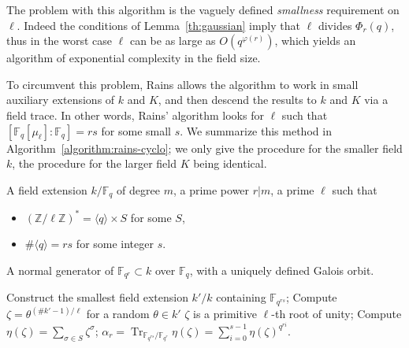 \documentclass[12pt]{article}
\theoremstyle{plain}
\theoremstyle{definition}
\DeclareMathOperator{\trace}{Tr} %
\def\Z{\ensuremath{\mathbb{Z}}}
\def\F{\ensuremath{\mathbb{F}}}
\def\euler{\ensuremath{\varphi}}
\newcounter{algorithm}
\begin{document}
The problem with this algorithm is the vaguely defined
\emph{smallness} requirement on $\ell$. Indeed the conditions of
Lemma~\ref{th:gaussian} imply that $\ell$ divides $\Phi_r(q)$, thus in
the worst case $\ell$ can be as large as $O(q^{\euler(r)})$, which
yields an algorithm of exponential complexity in the field size.

To circumvent this problem, Rains allows the algorithm to work in
small auxiliary extensions of $k$ and $K$, and then descend the
results to $k$ and $K$ via a field trace. In other words, Rains'
algorithm looks for $\ell$ such that $[\F_q[\mu_\ell]:\F_q]=rs$ for
some small $s$. We summarize this method in
Algorithm~\ref{algorithm:rains-cyclo}; we only give the procedure for
the smaller field $k$, the procedure for the larger field $K$ being
identical.

\begin{algorithm}
  \label{algorithm:rains-cyclo}
  \begin{algorithmic}[1]
    \REQUIRE A field extension $k/\F_q$ of degree $m$, a prime power
    $r|m$, a prime $\ell$ such that
    \begin{itemize}
    \item $(\Z/\ell\Z)^\ast = \langle q\rangle \times S$ for some $S$,
    \item $\#\langle q\rangle = rs$ for some integer $s$.
    \end{itemize}
    \ENSURE A normal generator of $\F_{q^r}\subset k$ over $\F_q$,
    with a uniquely defined Galois orbit.
    
    \STATE Construct the smallest field extension $k'/k$
    containing $\F_{q^{rs}}$; 
    \REPEAT
    \STATE Compute $\zeta = \theta^{(\#k'-1)/\ell}$ for a random $\theta\in k'$
    \UNTIL $\zeta$ is a primitive $\ell$-th root of unity;
    \STATE\label{algorithm:rains-cyclo:period} Compute $\eta(\zeta) = \sum_{\sigma\in S}\zeta^\sigma$;
    \RETURN\label{algorithm:rains-cyclo:trace} $\alpha_r = \trace_{\F_{q^{rs}}/\F_{q^r}}\eta(\zeta) = \sum_{i=0}^{s-1}\eta(\zeta)^{q^{ri}}$.
  \end{algorithmic}
\end{algorithm}
\end{document}
